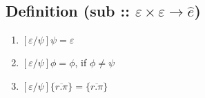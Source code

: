 \documentclass{llncs}
\begin{document}
\subsection*{Definition (sub :: $\varepsilon \times \varepsilon \rightarrow \hat e$)}

\begin{enumerate}
	\item $[\varepsilon/\psi]\psi = \varepsilon$
	\item $[\varepsilon/\psi]\phi = \phi$, if $\phi \neq \psi$
	\item $[\varepsilon/\psi]\{ \overline{r.\pi} \} = \{ \overline{r.\pi} \}$
\end{enumerate}
\end{document}
